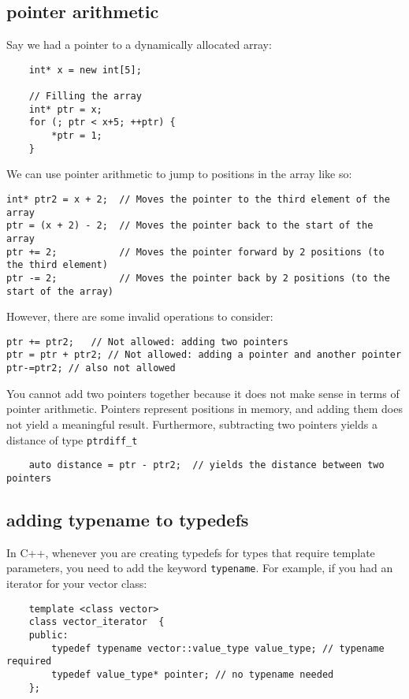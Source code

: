 \documentclass{report}
\begin{document}
    \subsection{pointer arithmetic}
    Say we had a pointer to a dynamically allocated array:
    \begin{verbatim}
    int* x = new int[5];
    
    // Filling the array
    int* ptr = x;
    for (; ptr < x+5; ++ptr) {
        *ptr = 1;
    }
    \end{verbatim}
    We can use pointer arithmetic to jump to positions in the array like so:
    \begin{verbatim}
int* ptr2 = x + 2;  // Moves the pointer to the third element of the array
ptr = (x + 2) - 2;  // Moves the pointer back to the start of the array
ptr += 2;           // Moves the pointer forward by 2 positions (to the third element)
ptr -= 2;           // Moves the pointer back by 2 positions (to the start of the array)
    \end{verbatim}
    However, there are some invalid operations to consider:
    \begin{verbatim}
ptr += ptr2;   // Not allowed: adding two pointers
ptr = ptr + ptr2; // Not allowed: adding a pointer and another pointer
ptr-=ptr2; // also not allowed

    \end{verbatim} 
  \noindent
You cannot add two pointers together because it does not make sense in terms of pointer arithmetic. Pointers represent positions in memory, and adding them does not yield a meaningful result.
\bigbreak \noindent
Furthermore, subtracting two pointers yields a distance of type \texttt{ptrdiff\_t}
\begin{verbatim}
    auto distance = ptr - ptr2;  // yields the distance between two pointers
\end{verbatim}
\subsection{adding typename to typedefs}
In C++, whenever you are creating typedefs for types that require template parameters, you need to add the keyword \texttt{typename}. For example, if you had an iterator for your vector class:
\begin{verbatim}
    template <class vector>
    class vector_iterator  {
    public:
        typedef typename vector::value_type value_type; // typename required
        typedef value_type* pointer; // no typename needed
    };
\end{verbatim}
\end{document}
